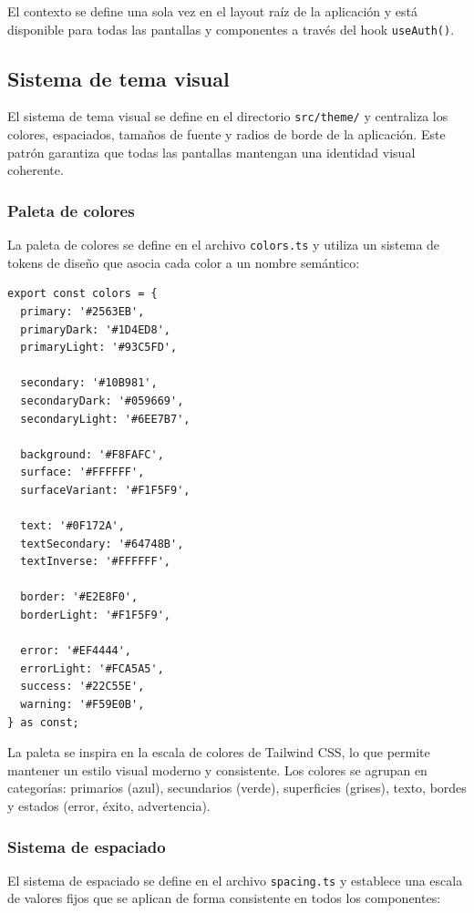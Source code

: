 El contexto se define una sola vez en el layout ra\'iz de la aplicaci\'on y
est\'a disponible para todas las pantallas y componentes a trav\'es del hook
\texttt{useAuth()}.

\subsection{Sistema de tema visual}

El sistema de tema visual se define en el directorio \texttt{src/theme/} y
centraliza los colores, espaciados, tama\~nos de fuente y radios de borde de
la aplicaci\'on. Este patr\'on garantiza que todas las pantallas mantengan una
identidad visual coherente.

\subsubsection{Paleta de colores}

La paleta de colores se define en el archivo \texttt{colors.ts} y utiliza un
sistema de tokens de diseño que asocia cada color a un nombre sem\'antico:

\begin{lstlisting}
export const colors = {
  primary: '#2563EB',
  primaryDark: '#1D4ED8',
  primaryLight: '#93C5FD',

  secondary: '#10B981',
  secondaryDark: '#059669',
  secondaryLight: '#6EE7B7',

  background: '#F8FAFC',
  surface: '#FFFFFF',
  surfaceVariant: '#F1F5F9',

  text: '#0F172A',
  textSecondary: '#64748B',
  textInverse: '#FFFFFF',

  border: '#E2E8F0',
  borderLight: '#F1F5F9',

  error: '#EF4444',
  errorLight: '#FCA5A5',
  success: '#22C55E',
  warning: '#F59E0B',
} as const;
\end{lstlisting}

La paleta se inspira en la escala de colores de Tailwind CSS, lo que permite
mantener un estilo visual moderno y consistente. Los colores se agrupan en
categor\'ias: primarios (azul), secundarios (verde), superficies (grises),
texto, bordes y estados (error, \'exito, advertencia).

\subsubsection{Sistema de espaciado}

El sistema de espaciado se define en el archivo \texttt{spacing.ts} y
establece una escala de valores fijos que se aplican de forma consistente en
todos los componentes:

